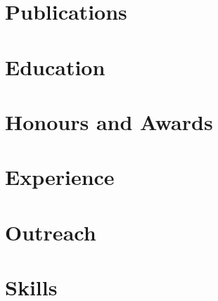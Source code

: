 \documentclass[english,a4paper,10pt,roman]{article}
\begin{document}
\thispagestyle{firstpage}



\section{Publications}


\section{Education}


\section{Honours and Awards}


\section{Experience}


\section{Outreach}


\section{Skills}


\end{document}
